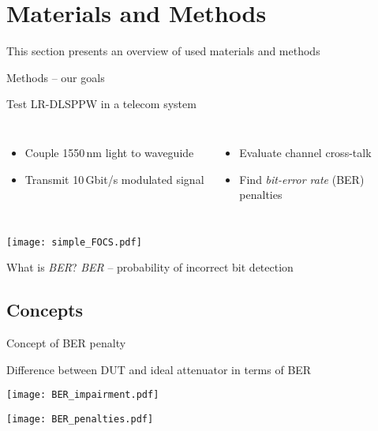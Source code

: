 \section{Materials and Methods}
  This section presents an overview of used materials and methods
  \begin{frame}{Methods -- our goals}
    \begin{block}{Test LR-DLSPPW in a telecom system}
    \begin{columns}
        \begin{itemize}
          \item Couple 1550\,nm light to waveguide
          \item Transmit 10\,Gbit/s modulated signal
        \end{itemize}
        \begin{itemize}
          \item Evaluate channel cross-talk
          \item Find \emph{bit-error rate} (BER)\\
                \hfill penalties~~~
        \end{itemize}
    \end{columns}
    \vspace{-5mm}
        \begin{center}
          \texttt{[image: simple\_FOCS.pdf]}
        \end{center}
    \end{block}
      \begin{exampleblock}{What is \emph{BER}?}
        \emph{BER} -- probability of incorrect bit detection\\
      \end{exampleblock}

  \end{frame}

  
 
  \subsection{Concepts} %
  \label{sub:concepts}
  \begin{frame}{Concept of BER penalty}
    \begin{block}{Difference between DUT and ideal attenuator in terms of BER}
      \begin{center}
        \texttt{[image: BER\_impairment.pdf]}
      \end{center}
    \end{block}
    \begin{center}
      \texttt{[image: BER\_penalties.pdf]}
    \end{center}
  \end{frame}



